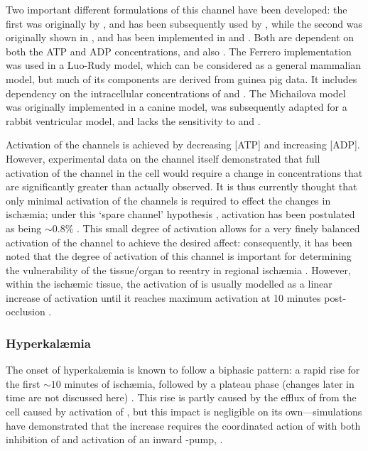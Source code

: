 \documentclass[../thesis-main.tex]{subfiles}
\begin{document}
Two important different formulations of this channel have been developed: the first was originally by \citet{Ferrero1996}, and has been subsequently used by \citet{Trenor2007}, while the second was originally shown in \citet{Michailova2005}, and has been implemented in \citet{Terkildsen2007} and \citet{Michailova2007}. Both are dependent on both the ATP and ADP concentrations, and also \ko{}. The Ferrero implementation was used in a Luo-Rudy model, which can be considered as a general mammalian model, but much of its components are derived from guinea pig data. It includes dependency on the intracellular concentrations of \na{} and \mg{}. The Michailova model was originally implemented in a canine model, was subsequently adapted for a rabbit ventricular model, and lacks the sensitivity to \na{} and \mg{}.

Activation of the \ikatp{} channels is achieved by decreasing [ATP] and increasing [ADP]. However, experimental data on the channel itself demonstrated that full activation of the channel in the cell would require a change in concentrations that are significantly greater than actually observed. It is thus currently thought that only minimal activation of the \ikatp{} channels is required to effect the changes in isch\ae{}mia; under this `spare channel' hypothesis \citep{Cook1988}, activation has been postulated as being $\sim0.8\%$ \citep{Rodriguez2002, Weiss1992, Ferrero1996, Trenor2007, Ferrero2003}. This small degree of activation allows for a very finely balanced activation of the channel to achieve the desired affect: consequently, it has been noted that the degree of activation of this channel is important for determining the vulnerability of the tissue/organ to reentry in regional isch\ae{}mia \citep{Ferrero2003a, Trenor2005}. However, within the isch\ae{}mic tissue, the activation of \ikatp{} is usually modelled as a linear increase of activation until it reaches maximum activation at 10 minutes post-occlusion \citep{Trenor2007, Tice2007}.

\subsubsection{Hyperkal\ae{}mia}
\label{subsubsec:hyperkalaemia}
The onset of hyperkal\ae{}mia is known to follow a biphasic pattern: a rapid rise for the first $\sim10$ minutes of isch\ae{}mia, followed by a plateau phase (changes later in time are not discussed here) \citep{Wilde1988}. This rise is partly caused by the efflux of \K{} from the cell caused by activation of \ikatp{}, but this impact is negligible on its own---simulations have demonstrated that the increase requires the coordinated action of \ikatp{} with both inhibition of \inak{} and activation of an inward \na{}-pump, \inas{} \citep{Rodriguez2001, Rodriguez2001a, Rodriguez2002, Terkildsen2007}.
\end{document}
